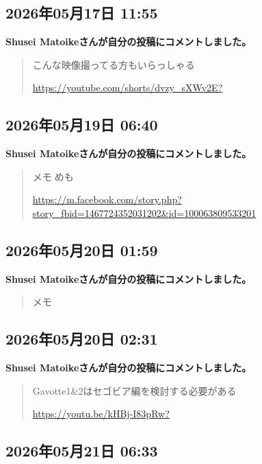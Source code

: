 \subsection*{2026年05月17日 11:55}

\textbf{Shusei Matoikeさんが自分の投稿にコメントしました。}

\begin{quote}
こんな映像撮ってる方もいらっしゃる

\url{https://youtube.com/shorts/dvzy_sXWv2E?}
\end{quote}

\subsection*{2026年05月19日 06:40}

\textbf{Shusei Matoikeさんが自分の投稿にコメントしました。}

\begin{quote}
メモ👀めも

\url{https://m.facebook.com/story.php?story_fbid=1467724352031202&id=100063809533201}
\end{quote}

\subsection*{2026年05月20日 01:59}

\textbf{Shusei Matoikeさんが自分の投稿にコメントしました。}

\begin{quote}
メモ
\end{quote}

\subsection*{2026年05月20日 02:31}

\textbf{Shusei Matoikeさんが自分の投稿にコメントしました。}

\begin{quote}
Gavotte1\&2はセゴビア編を検討する必要がある

\url{https://youtu.be/kHBj-I83pRw?}
\end{quote}

\subsection*{2026年05月21日 06:33}

